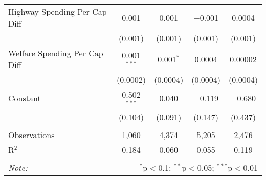 \begin{table}[!htbp]
\begin{tabular}{@{\extracolsep{5pt}}lcccc}
  Highway Spending Per Cap Diff & 0.001 & 0.001 & $-$0.001 & 0.0004 \\ 
  & (0.001) & (0.001) & (0.001) & (0.001) \\ 
  Welfare Spending Per Cap Diff & 0.001$^{***}$ & 0.001$^{*}$ & 0.0004 & 0.00002 \\ 
  & (0.0002) & (0.0004) & (0.0004) & (0.0004) \\ 
  Constant & 0.502$^{***}$ & 0.040 & $-$0.119 & $-$0.680 \\ 
  & (0.104) & (0.091) & (0.147) & (0.437) \\ 
 \hline \\[-1.8ex] 
Observations & 1,060 & 4,374 & 5,205 & 2,476 \\ 
R$^{2}$ & 0.184 & 0.060 & 0.055 & 0.119 \\ 
\hline 
\hline \\[-1.8ex] 
\textit{Note:}  & \multicolumn{4}{r}{$^{*}$p$<$0.1; $^{**}$p$<$0.05; $^{***}$p$<$0.01} \\ 
\end{tabular} 
\end{table} 
